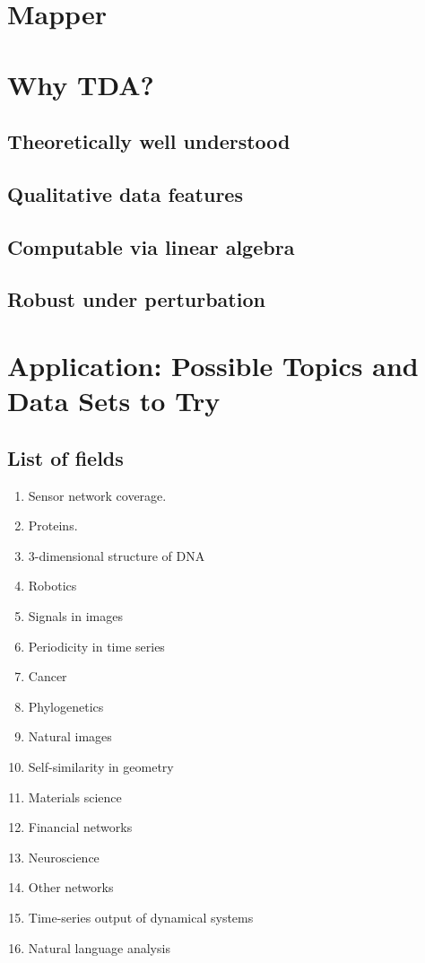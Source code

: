 \documentclass[10pt,a4paper]{article}
\begin{document}
\section{Mapper}

\section{Why TDA?}
\subsection{Theoretically well understood}
\subsection{Qualitative data features}
\subsection{Computable via linear algebra}
\subsection{Robust under perturbation}

\section{Application: Possible Topics and Data Sets to Try}
\subsection{List of fields}
\begin{enumerate}
	\item Sensor network coverage.
	\item Proteins.
	\item 3-dimensional structure of DNA
	\item Robotics
	\item Signals in images
	\item Periodicity in time series
	\item Cancer
	\item Phylogenetics
	\item Natural images
	\item Self-similarity in geometry
	\item Materials science
	\item Financial networks
	\item Neuroscience
	\item Other networks
	\item Time-series output of dynamical systems
	\item Natural language analysis
\end{enumerate}
\end{document}
